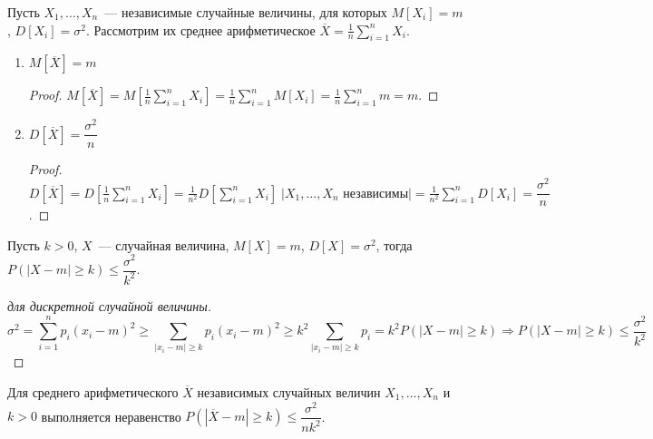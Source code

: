 Пусть $X_1, \ldots, X_n$~--- независимые случайные величины, для которых $M[X_i] = m$, $D[X_i] = \sigma^2$.
Рассмотрим их среднее арифметическое $\overline X = \frac1n \sum\limits_{i=1}^n X_i$.
\begin{enumerate}
	\item $M\left[\overline X\right] = m$
	\begin{proof}
	$M\left[\overline X\right] =
	M\left[\frac1n \sum\limits_{i=1}^n X_i\right] =
	\frac1n \sum\limits_{i=1}^n M[X_i] =
	\frac1n \sum\limits_{i=1}^n m =
	m$.
	\end{proof}
	
	\item $D\left[\overline X\right] = \dfrac{\sigma^2}n$
	\begin{proof}
	$D\left[\overline X\right] =
	D\left[\frac1n \sum\limits_{i=1}^n X_i\right] =
	\frac1{n^2} D\left[\sum\limits_{i=1}^n X_i\right] \;
	\left| X_1, \ldots, X_n \text{ независимы} \right| =
	\frac1{n^2} \sum\limits_{i=1}^n D[X_i] =
	\dfrac{\sigma^2}n$.
	\end{proof}
\end{enumerate}

\begin{theorem}
Пусть $k > 0$, $X$~--- случайная величина, $M[X] = m$, $D[X] = \sigma^2$, тогда $P(|X - m| \geqslant k) \leqslant \dfrac{\sigma^2}{k^2}$.
\end{theorem}
\begin{proof}[для дискретной случайной величины]
\begin{equation*}
\sigma^2 =
\sum_{i=1}^n p_i (x_i - m)^2 \geqslant
\sum_{|x_i - m| \geqslant k} p_i (x_i - m)^2 \geqslant
k^2 \sum_{|x_i - m| \geqslant k} p_i =
k^2 P(|X - m| \geqslant k) \Rightarrow
P(|X - m| \geqslant k) \leqslant \frac{\sigma^2}{k^2}
\end{equation*}
\end{proof}

\begin{consequent}
Для среднего арифметического $\overline X$ независимых случайных величин $X_1, \ldots, X_n$ и $k > 0$ выполняется неравенство $P(|\overline X - m| \geqslant k) \leqslant \dfrac{\sigma^2}{n k^2}$.
\end{consequent}


